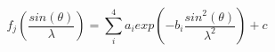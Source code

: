 


$$ 
  f_j\left ( \frac{sin(\theta)}{\lambda} \right )=\sum_{i}^{4} 
a_i exp\left ( -b_i \frac{sin^{2}(\theta)}{\lambda^{2}} \right )+c
$$


